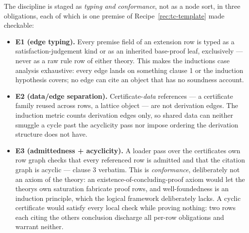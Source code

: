 \begin{brecipe}\label{rec:tc-instance}
The discipline is staged as \emph{typing and conformance}, not as a
node sort, in three obligations, each of which is one premise of
Recipe~\ref{rec:tc-template} made checkable:
\begin{itemize}
\item \textbf{E1 (edge typing).} Every premise field of an extension
  row is typed as a satisfaction-judgement kind or as an inherited
  base-proof leaf, exclusively --- never as a raw rule row of either
  theory. This makes the induction\textquotesingle s case analysis
  exhaustive: every edge lands on something clause 1 or the induction
  hypothesis covers; no edge can cite an object that has no soundness
  account.
\item \textbf{E2 (data/edge separation).} Certificate-\emph{data}
  references --- a certificate family reused across rows, a lattice
  object --- are not derivation edges. The induction metric counts
  derivation edges only, so shared data can neither smuggle a cycle
  past the acyclicity pass nor impose ordering the derivation
  structure does not have.
\item \textbf{E3 (admittedness + acyclicity).} A loader pass over the
  certificate\textquotesingle s own row graph checks that every
  referenced row is admitted and that the citation graph is acyclic
  --- clause 3 verbatim. This is \emph{conformance}, deliberately not
  an axiom of the theory: an existence-of-concluding-proof axiom would
  let the theory\textquotesingle s own saturation fabricate proof
  rows, and well-foundedness is an induction principle, which the
  logical framework deliberately lacks. A cyclic certificate would
  satisfy every local check while proving nothing: two rows each
  citing the other\textquotesingle s conclusion discharge all per-row
  obligations and warrant neither.
\end{itemize}
\end{brecipe}

